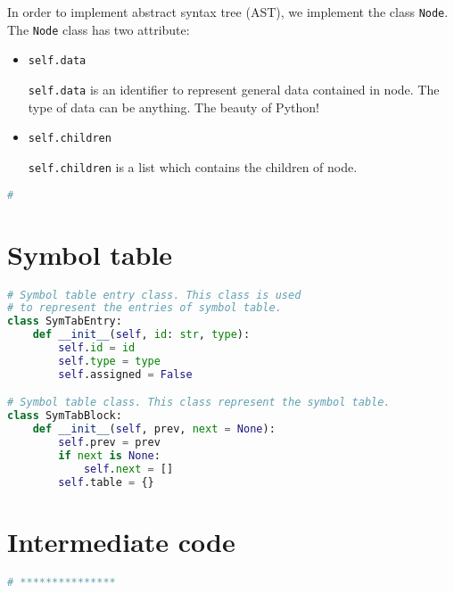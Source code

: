 \documentclass{article}
\newcommand{\code}[1]{\texttt{#1}}
\begin{document}
	In order to implement abstract syntax tree (AST), we implement the class \code{Node}. The \code{Node} class has two attribute:

	\begin{itemize}
		\item \code{self.data}
		
		\code{self.data} is an identifier to represent general data contained in node. The type of data can be anything. The beauty of Python!

		\item \code{self.children}
		
		\code{self.children} is a list which contains the children of node.

	\end{itemize}

	\begin{lstlisting}[language=python]
# 
	\end{lstlisting}


	\section{Symbol table}



	\begin{lstlisting}[language=python]
# Symbol table entry class. This class is used
# to represent the entries of symbol table.
class SymTabEntry:
    def __init__(self, id: str, type):
        self.id = id
        self.type = type
		self.assigned = False

# Symbol table class. This class represent the symbol table.
class SymTabBlock:
    def __init__(self, prev, next = None):
        self.prev = prev
		if next is None:
			self.next = []
		self.table = {}
	\end{lstlisting}


	\section{Intermediate code}

	\begin{lstlisting}[language=python]
# ***************
	\end{lstlisting}
\end{document}
